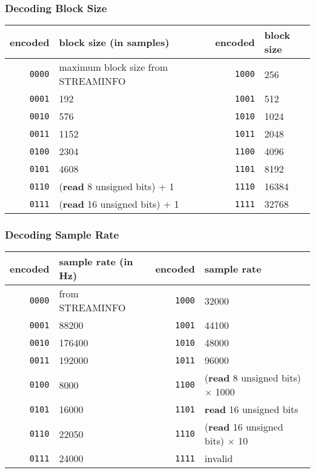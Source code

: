 \clearpage

\subsubsection{Decoding Block Size}
{
\begin{tabular}{rl||rl}
encoded & block size (in samples) &
encoded & block size \\
\hline
\texttt{0000} & maximum block size from STREAMINFO &
\texttt{1000} & 256 \\
\texttt{0001} & 192 &
\texttt{1001} & 512 \\
\texttt{0010} & 576 &
\texttt{1010} & 1024 \\
\texttt{0011} & 1152 &
\texttt{1011} & 2048 \\
\texttt{0100} & 2304 &
\texttt{1100} & 4096 \\
\texttt{0101} & 4608 &
\texttt{1101} & 8192 \\
\texttt{0110} & (\textbf{read} 8 unsigned bits) + 1 &
\texttt{1110} & 16384 \\
\texttt{0111} & (\textbf{read} 16 unsigned bits) + 1 &
\texttt{1111} & 32768 \\
\end{tabular}
}

\subsubsection{Decoding Sample Rate}
{
\begin{tabular}{rl||rl}
encoded & sample rate (in Hz) &
encoded & sample rate \\
\hline
\texttt{0000} & from STREAMINFO &
\texttt{1000} & 32000 \\
\texttt{0001} & 88200 &
\texttt{1001} & 44100 \\
\texttt{0010} & 176400 &
\texttt{1010} & 48000 \\
\texttt{0011} & 192000 &
\texttt{1011} & 96000 \\
\texttt{0100} & 8000 &
\texttt{1100} & (\textbf{read} 8 unsigned bits) $\times$ 1000 \\
\texttt{0101} & 16000 &
\texttt{1101} & \textbf{read} 16 unsigned bits \\
\texttt{0110} & 22050 &
\texttt{1110} & (\textbf{read} 16 unsigned bits) $\times$ 10 \\
\texttt{0111} & 24000 &
\texttt{1111} & invalid \\
\end{tabular}
}

